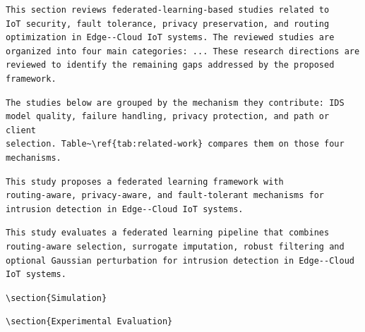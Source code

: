 \documentclass[10pt,a4paper]{article}
\begin{document}
\begin{before}[lines 307--315]
\begin{Verbatim}
This section reviews federated-learning-based studies related to
IoT security, fault tolerance, privacy preservation, and routing
optimization in Edge--Cloud IoT systems. The reviewed studies are
organized into four main categories: ... These research directions are
reviewed to identify the remaining gaps addressed by the proposed
framework.
\end{Verbatim}
\end{before}
\begin{after}
\begin{Verbatim}
The studies below are grouped by the mechanism they contribute: IDS
model quality, failure handling, privacy protection, and path or client
selection. Table~\ref{tab:related-work} compares them on those four
mechanisms.
\end{Verbatim}
\end{after}

\begin{before}[lines 654--656]
\begin{Verbatim}
This study proposes a federated learning framework with
routing-aware, privacy-aware, and fault-tolerant mechanisms for
intrusion detection in Edge--Cloud IoT systems.
\end{Verbatim}
\end{before}
\begin{after}
\begin{Verbatim}
This study evaluates a federated learning pipeline that combines
routing-aware selection, surrogate imputation, robust filtering and
optional Gaussian perturbation for intrusion detection in Edge--Cloud
IoT systems.
\end{Verbatim}
\end{after}

\begin{before}[line 1298]
\begin{Verbatim}
\section{Simulation}
\end{Verbatim}
\end{before}
\begin{after}
\begin{Verbatim}
\section{Experimental Evaluation}
\end{Verbatim}
\end{after}
\end{document}
